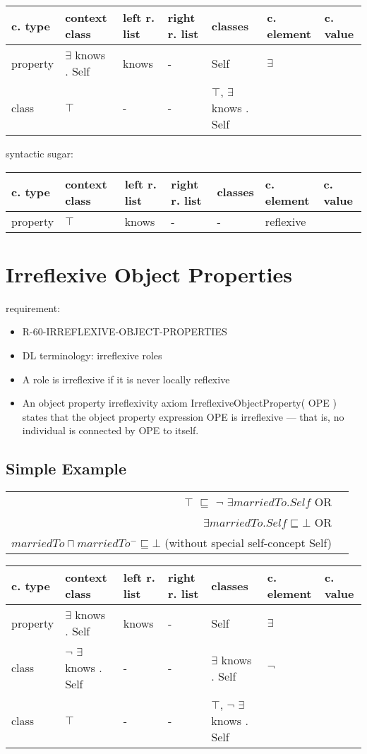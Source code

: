 \documentclass{llncs}
\newenvironment{gcotable}{
  \scriptsize
  \sffamily
  \vspace{0.3cm}
	\begin{center}
  \begin{tabular}{l|l|l|l|l|l|l}
  \hline
  \textbf{c. type} & \textbf{context class} & \textbf{left r. list} & \textbf{right r. list} & \textbf{classes} & \textbf{c. element} & \textbf{c. value} \\
  \hline

}{
  \hline
  \end{tabular}
	\end{center}
}
\newenvironment{DL}{
	\begin{center}
  \begin{tabular}{r l}

}{
  \end{tabular}
	\end{center}
}
\begin{document}
\begin{gcotable}
property & $\exists$ knows . Self & knows & - & Self & $\exists$ \\
class & $\top$ & - & - & $\top$, $\exists$ knows . Self & \sqsubseteq \\
\end{gcotable}

syntactic sugar:

\begin{gcotable}
property & $\top$ & knows & - & - & reflexive \\
\end{gcotable}

\section{Irreflexive Object Properties}

requirement:

\begin{itemize}
	\item R-60-IRREFLEXIVE-OBJECT-PROPERTIES
\end{itemize}

\begin{itemize}
	\item DL terminology: irreflexive roles
  \item A role is irreflexive if it is never locally reflexive \cite{Kroetzsch2012}
	\item An object property irreflexivity axiom IrreflexiveObjectProperty( OPE ) states that the object property expression OPE is irreflexive — that is, no individual is connected by OPE to itself. 
\end{itemize}

\subsection{Simple Example}

\begin{DL}
$\top$ $\sqsubseteq$ $\neg$ $\exists  marriedTo . Self$   OR\\
$\exists marriedTo . Self \sqsubseteq \bot$  OR\\
$marriedTo \sqcap marriedTo^{-} \sqsubseteq \bot$ (without special self-concept Self)
\end{DL}

\begin{gcotable}
property & $\exists$ knows . Self & knows & - & Self & $\exists$ \\
class & $\neg$ $\exists$ knows . Self & - & - & $\exists$ knows . Self & $\neg$ \\
class & $\top$ & - & - & $\top$, $\neg$ $\exists$ knows . Self & \sqsubseteq \\
\end{gcotable}
\end{document}
